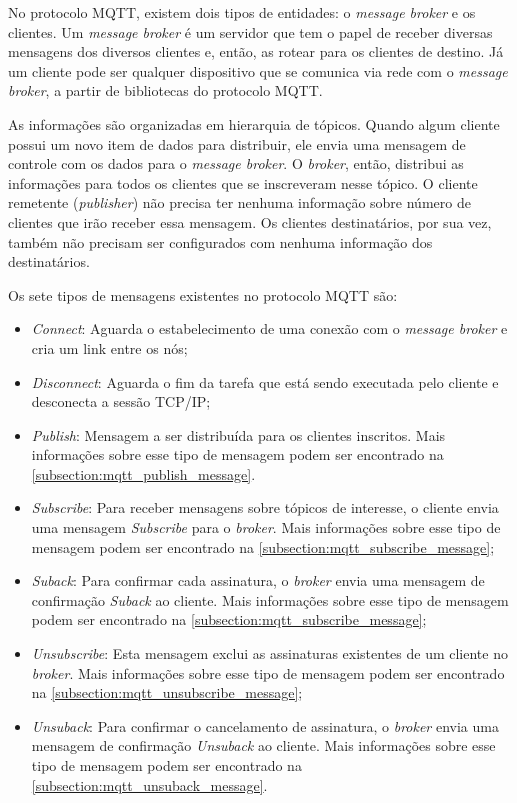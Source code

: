 No protocolo MQTT, existem dois tipos de entidades: o \textit{message broker} e os clientes. Um \textit{message broker} é um servidor que tem o papel de receber diversas mensagens dos diversos clientes e, então, as rotear para os clientes de destino. Já um cliente pode ser qualquer dispositivo que se comunica via rede com o \textit{message broker}, a partir de bibliotecas do protocolo MQTT.

As informações são organizadas em hierarquia de tópicos. Quando algum cliente possui um novo item de dados para distribuir, ele envia uma mensagem de controle com os dados para o \textit{message broker}. O \textit{broker}, então, distribui as informações para todos os clientes que se inscreveram nesse tópico. O cliente remetente (\textit{publisher}) não precisa ter nenhuma informação sobre número de clientes que irão receber essa mensagem. Os clientes destinatários, por sua vez, também não precisam ser configurados com nenhuma informação dos destinatários.

Os sete tipos de mensagens existentes no protocolo MQTT são:

\begin{itemize}
	\item \textit{Connect}: Aguarda o estabelecimento de uma conexão com o \textit{message broker} e cria um link entre os nós;
	\item \textit{Disconnect}: Aguarda o fim da tarefa que está sendo executada pelo cliente e desconecta a sessão TCP/IP;
	\item \textit{Publish}: Mensagem a ser distribuída para os clientes inscritos. Mais informações sobre esse tipo de mensagem podem ser encontrado na \autoref{subsection:mqtt_publish_message}.
	\item \textit{Subscribe}: Para receber mensagens sobre tópicos de interesse, o cliente envia uma mensagem \textit{Subscribe} para o \textit{broker}. Mais informações sobre esse tipo de mensagem podem ser encontrado na \autoref{subsection:mqtt_subscribe_message};
	\item \textit{Suback}: Para confirmar cada assinatura, o \textit{broker} envia uma mensagem de confirmação \textit{Suback} ao cliente. Mais informações sobre esse tipo de mensagem podem ser encontrado na \autoref{subsection:mqtt_subscribe_message};
	\item \textit{Unsubscribe}: Esta mensagem exclui as assinaturas existentes de um cliente no \textit{broker}. Mais informações sobre esse tipo de mensagem podem ser encontrado na \autoref{subsection:mqtt_unsubscribe_message};
	\item \textit{Unsuback}: Para confirmar o cancelamento de assinatura, o \textit{broker} envia uma mensagem de confirmação \textit{Unsuback} ao cliente. Mais informações sobre esse tipo de mensagem podem ser encontrado na \autoref{subsection:mqtt_unsuback_message}.
\end{itemize}

